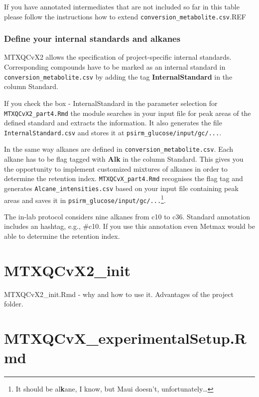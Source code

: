 \documentclass[]{book}
\let\rmarkdownfootnote\footnote%
\def\footnote{\protect\rmarkdownfootnote}
\begin{document}
If you have annotated intermediates that are not included so far in this
table please follow the instructions how to extend
\texttt{conversion\_metabolite.csv}.REF

\subsection{Define your internal standards and
alkanes}\label{define-your-internal-standards-and-alkanes}

MTXQCvX2 allows the specification of project-specific internal
standards. Corresponding compounds have to be marked as an internal
standard in \texttt{conversion\_metabolite.csv} by adding the tag
\textbf{InternalStandard} in the column Standard.

If you check the box - InternalStandard in the parameter selection for
\texttt{MTXQCvX2\_part4.Rmd} the module searches in your input file for
peak areas of the defined standard and extracts the information. It also
generates the file \texttt{InternalStandard.csv} and stores it at
\texttt{psirm\_glucose/input/gc/...}.

In the same way alkanes are defined in
\texttt{conversion\_metabolite.csv}. Each alkane has to be flag tagged
with \textbf{Alk} in the column Standard. This gives you the opportunity
to implement customized mixtures of alkanes in order to determine the
retention index. \texttt{MTXQCvX\_part4.Rmd} recognises the flag tag and
generates \texttt{Alcane\_intensities.csv} based on your input file
containing peak areas and saves it in
\texttt{psirm\_glucose/input/gc/...}\footnote{It should be
  al\textbf{k}ane, I know, but Maui doesn't, unfortunately\ldots{}}.

The in-lab protocol considers nine alkanes from c10 to c36. Standard
annotation includes an hashtag, e.g., \#c10. If you use this annotation
even Metmax would be able to determine the retention index.

\chapter{MTXQCvX2\_init}\label{init}

MTXQCvX2\_init.Rmd - why and how to use it. Advantages of the project
folder.

\chapter{MTXQCvX\_experimentalSetup.Rmd}\label{ExpSetup}
\end{document}
